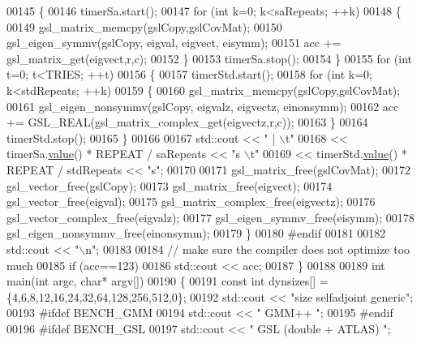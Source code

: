 \begin{DoxyCode}
00145     \{
00146       timerSa.start();
00147       \textcolor{keywordflow}{for} (\textcolor{keywordtype}{int} k=0; k<saRepeats; ++k)
00148       \{
00149         gsl\_matrix\_memcpy(gslCopy,gslCovMat);
00150         gsl\_eigen\_symmv(gslCopy, eigval, eigvect, eisymm);
00151         acc += gsl\_matrix\_get(eigvect,r,c);
00152       \}
00153       timerSa.stop();
00154     \}
00155     \textcolor{keywordflow}{for} (\textcolor{keywordtype}{int} t=0; t<TRIES; ++t)
00156     \{
00157       timerStd.start();
00158       \textcolor{keywordflow}{for} (\textcolor{keywordtype}{int} k=0; k<stdRepeats; ++k)
00159       \{
00160         gsl\_matrix\_memcpy(gslCopy,gslCovMat);
00161         gsl\_eigen\_nonsymmv(gslCopy, eigvalz, eigvectz, einonsymm);
00162         acc += GSL\_REAL(gsl\_matrix\_complex\_get(eigvectz,r,c));
00163       \}
00164       timerStd.stop();
00165     \}
00166 
00167     std::cout << \textcolor{stringliteral}{" | \(\backslash\)t"}
00168               << timerSa.\hyperlink{class_eigen_1_1_bench_timer_a26760f963ed8b64c126159bfea57735e}{value}() * REPEAT / saRepeats << \textcolor{stringliteral}{"s \(\backslash\)t"}
00169               << timerStd.\hyperlink{class_eigen_1_1_bench_timer_a26760f963ed8b64c126159bfea57735e}{value}() * REPEAT / stdRepeats << \textcolor{stringliteral}{"s"};
00170 
00171     gsl\_matrix\_free(gslCovMat);
00172     gsl\_vector\_free(gslCopy);
00173     gsl\_matrix\_free(eigvect);
00174     gsl\_vector\_free(eigval);
00175     gsl\_matrix\_complex\_free(eigvectz);
00176     gsl\_vector\_complex\_free(eigvalz);
00177     gsl\_eigen\_symmv\_free(eisymm);
00178     gsl\_eigen\_nonsymmv\_free(einonsymm);
00179   \}
00180 \textcolor{preprocessor}{  #endif}
00181 
00182   std::cout << \textcolor{stringliteral}{"\(\backslash\)n"};
00183   
00184   \textcolor{comment}{// make sure the compiler does not optimize too much}
00185   \textcolor{keywordflow}{if} (acc==123)
00186     std::cout << acc;
00187 \}
00188 
00189 \textcolor{keywordtype}{int} main(\textcolor{keywordtype}{int} argc, \textcolor{keywordtype}{char}* argv[])
00190 \{
00191   \textcolor{keyword}{const} \textcolor{keywordtype}{int} dynsizes[] = \{4,6,8,12,16,24,32,64,128,256,512,0\};
00192   std::cout << \textcolor{stringliteral}{"size            selfadjoint       generic"};
00193 \textcolor{preprocessor}{  #ifdef BENCH\_GMM}
00194   std::cout << \textcolor{stringliteral}{"        GMM++          "};
00195 \textcolor{preprocessor}{  #endif}
00196 \textcolor{preprocessor}{  #ifdef BENCH\_GSL}
00197   std::cout << \textcolor{stringliteral}{"       GSL (double + ATLAS)  "};

\end{DoxyCode}
